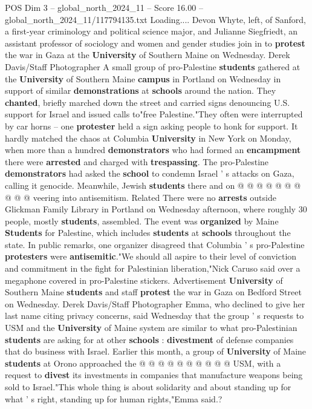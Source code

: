 \begin{textsample}{POS Dim 3 – global\_north\_2024\_11 – Score 16.00 – global\_north\_2024\_11/117794135.txt}  \label{ex:f3_pos_170}
Loading....
Devon Whyte, left, of Sanford, a first-year criminology and political science major, and Julianne Siegfriedt, an assistant professor of sociology and women and gender studies join in to \textbf{protest} the war in Gaza at the \textbf{University} of Southern Maine on Wednesday.
Derek Davis/Staff Photographer A small group of pro-Palestine \textbf{students} gathered at the \textbf{University} of Southern Maine \textbf{campus} in Portland on Wednesday in support of similar \textbf{demonstrations} at \textbf{schools} around the nation.
They \textbf{chanted}, briefly marched down the street and carried signs denouncing U.S. support for Israel and issued calls to"free Palestine."They often were interrupted by car horns -- one \textbf{protester} held a sign asking people to honk for support.
It hardly matched the chaos at Columbia \textbf{University} in New York on Monday, when more than a hundred \textbf{demonstrators} who had formed an \textbf{encampment} there were \textbf{arrested} and charged with \textbf{trespassing}.
The pro-Palestine \textbf{demonstrators} had asked the \textbf{school} to condemn Israel ' s attacks on Gaza, calling it genocide.
Meanwhile, Jewish \textbf{students} there and on @ @ @ @ @ @ @ @ @ @ veering into antisemitism.
Related There were no \textbf{arrests} outside Glickman Family Library in Portland on Wednesday afternoon, where roughly 30 people, mostly \textbf{students}, assembled.
The event was \textbf{organized} by Maine \textbf{Students} for Palestine, which includes \textbf{students} at \textbf{schools} throughout the state.
In public remarks, one organizer disagreed that Columbia ' s pro-Palestine \textbf{protesters} were \textbf{antisemitic}."We should all aspire to their level of conviction and commitment in the fight for Palestinian liberation,"Nick Caruso said over a megaphone covered in pro-Palestine stickers.
Advertisement \textbf{University} of Southern Maine \textbf{students} and staff \textbf{protest} the war in Gaza on Bedford Street on Wednesday.
Derek Davis/Staff Photographer Emma, who declined to give her last name citing privacy concerns, said Wednesday that the group ' s requests to USM and the \textbf{University} of Maine system are similar to what pro-Palestinian \textbf{students} are asking for at other \textbf{schools} : \textbf{divestment} of defense companies that do business with Israel.
Earlier this month, a group of \textbf{University} of Maine \textbf{students} at Orono approached the @ @ @ @ @ @ @ @ @ @ USM, with a request to \textbf{divest} its investments in companies that manufacture weapons being sold to Israel."This whole thing is about solidarity and about standing up for what ' s right, standing up for human rights,"Emma said.?

\end{textsample}
